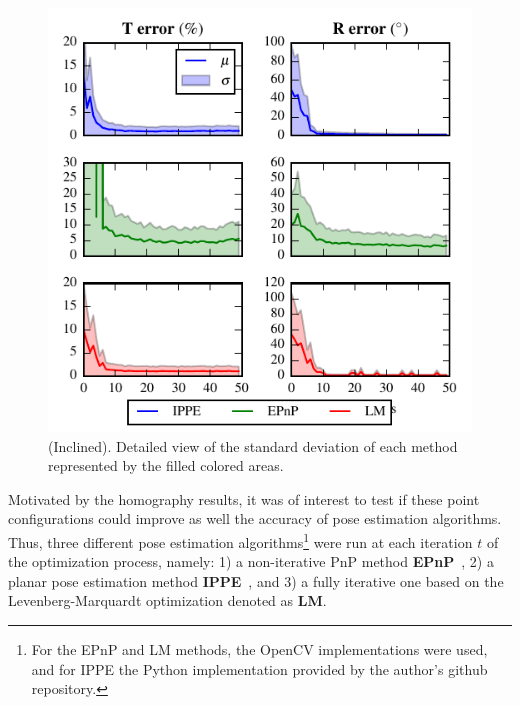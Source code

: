 \documentclass[letterpaper, 10 pt, conference]{ieeeconf}  %
\begin{document}
	\begin{figure}[t]
		\begin{center}
			\includegraphics[width=\columnwidth]{img/pose_separate_inclined.pdf}
			\caption{\label{fig:IN_pnp_results_detailed}\small (Inclined). Detailed view of the standard deviation of each method represented by the filled colored areas.}
		\end{center}
		\vspace{-0.5cm}
	\end{figure}
	
	
	
	Motivated by the homography results, it was of interest to test if these point configurations could improve as well the accuracy of pose estimation algorithms. Thus, three different pose estimation algorithms\footnote{For the EPnP and LM methods, the OpenCV implementations were used, and for IPPE the Python implementation provided by the author's github repository.} were run at each iteration $t$ of the optimization process, namely: 1) a non-iterative PnP method \textbf{EPnP}~\cite{Lepetit2008}, 2) a planar pose estimation method \textbf{IPPE}~\cite{Collins2014}, and 3) a fully iterative one based on the Levenberg-Marquardt optimization denoted as \textbf{LM}. 
	
\end{document}
